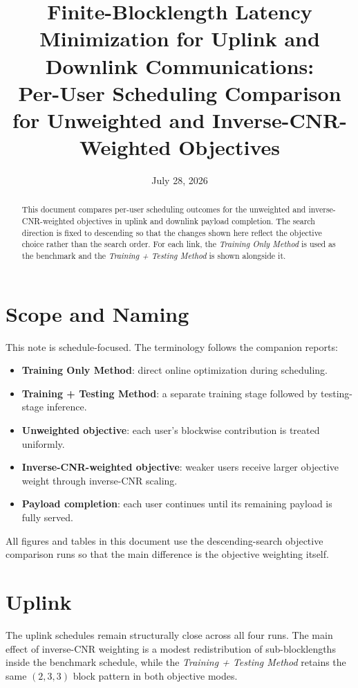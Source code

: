\documentclass[11pt]{article}
\title{Finite-Blocklength Latency Minimization for Uplink and Downlink Communications:\\Per-User Scheduling Comparison for Unweighted and Inverse-CNR-Weighted Objectives}
\author{}
\date{July 28, 2026}
\begin{document}
\maketitle

\begin{abstract}
This document compares per-user scheduling outcomes for the unweighted and
inverse-CNR-weighted objectives in uplink and downlink payload completion. The
search direction is fixed to descending so that the changes shown here reflect
the objective choice rather than the search order. For each link, the
\emph{Training Only Method} is used as the benchmark and the
\emph{Training + Testing Method} is shown alongside it.
\end{abstract}

\section{Scope and Naming}

This note is schedule-focused. The terminology follows the companion reports:
\begin{itemize}[leftmargin=1.5em]
    \item \textbf{Training Only Method}: direct online optimization during scheduling.
    \item \textbf{Training + Testing Method}: a separate training stage followed by testing-stage inference.
    \item \textbf{Unweighted objective}: each user's blockwise contribution is treated uniformly.
    \item \textbf{Inverse-CNR-weighted objective}: weaker users receive larger objective weight through inverse-CNR scaling.
    \item \textbf{Payload completion}: each user continues until its remaining payload is fully served.
\end{itemize}

All figures and tables in this document use the descending-search objective
comparison runs so that the main difference is the objective weighting itself.

\section{Uplink}

The uplink schedules remain structurally close across all four runs. The main
effect of inverse-CNR weighting is a modest redistribution of sub-blocklengths
inside the benchmark schedule, while the \emph{Training + Testing Method}
retains the same \((2,3,3)\) block pattern in both objective modes.
\end{document}
